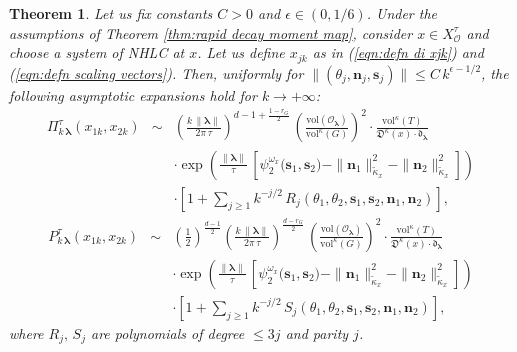 \documentclass[12pt,a4paper]{article}
\theoremstyle{plain}
\newtheorem{thm}{Theorem}[section]
\theoremstyle{definition}
\begin{document}
\begin{thm}
\label{thm:rescaled asympt}
Let us fix constants $C>0$ and $\epsilon\in (0,1/6)$.
Under the assumptions of Theorem 
\ref{thm:rapid decay moment map}, consider $x\in X^\tau_{\mathcal{O}}$ and choose a system
of NHLC at $x$. Let us define 
$x_{jk}$ as in (\ref{eqn:defn di xjk})
and (\ref{eqn:defn scaling vectors}).
Then, uniformly for 
$\|(\theta_j,\mathbf{n}_j,\mathbf{s}_j)\|
\le C\,k^{\epsilon-1/2}$, the following asymptotic expansions
hold for $k\rightarrow +\infty$:
\begin{eqnarray*}
\Pi^\tau_{k\,\boldsymbol{\lambda}}(x_{1k},x_{2k})
&\sim&
\left( \frac{k\,\| \boldsymbol{\lambda} \|}{2\pi\,\tau}  \right)
^{d-1+\frac{1-r_G}{2}}\,
\left(\frac{\mathrm{vol}(\mathcal{O}_{\boldsymbol{\lambda}})}{\mathrm{vol}^\kappa (G)}\right)^2\cdot 
\frac{\mathrm{vol}^\kappa
(T)}{\mathfrak{D}^\kappa (x)\cdot\mathfrak{d}_{\boldsymbol{\lambda}}}\nonumber
%
\\
&&\cdot 
\exp\left(\frac{\|\boldsymbol{\lambda}\|}{\tau}\,\left[
\psi_2^{\omega_x}\big( \mathbf{s}_1
%
,
\mathbf{s}_2  \big)
-\|
\mathbf{n}_1\|_{\tilde{\kappa}_x}^2
-\|\mathbf{n}_2\|_{\tilde{\kappa}_x}  ^2
\right]\right)\nonumber\\
&&\cdot \left[1+\sum_{j\ge 1}k^{-j/2}\,R_j(\theta_1,\theta_2,\mathbf{s}_1,
\mathbf{s}_2,\mathbf{n}_1,
\mathbf{n}_2)    \right],\nonumber
\end{eqnarray*}
%
%
\begin{eqnarray*}
P^\tau_{k\,\boldsymbol{\lambda}}(x_{1k},x_{2k})
&\sim&
\left(  \frac{1}{2} \right)^{\frac{d-1}{2}}
\left( \frac{k\,\| \boldsymbol{\lambda} \|}{2\pi\,\tau}  \right)
^{\frac{d-r_G}{2}}\,
\left(\frac{\mathrm{vol}(\mathcal{O}_{\boldsymbol{\lambda}})}{\mathrm{vol}^\kappa (G)}\right)^2\cdot 
\frac{\mathrm{vol}^\kappa
(T)}{\mathfrak{D}^\kappa (x)\cdot\mathfrak{d}_{\boldsymbol{\lambda}}}\nonumber
%
\\
&&\cdot 
\exp\left(\frac{\|\boldsymbol{\lambda}\|}{\tau}\,\left[
\psi_2^{\omega_x}\big( \mathbf{s}_1
%
,
\mathbf{s}_2  \big)
-\|
\mathbf{n}_1\|_{\tilde{\kappa}_x}^2
-\|\mathbf{n}_2\|_{\tilde{\kappa}_x}  ^2
\right]\right)\nonumber\\
&&\cdot \left[1+\sum_{j\ge 1}k^{-j/2}\,S_j(\theta_1,\theta_2,\mathbf{s}_1,
\mathbf{s}_2,\mathbf{n}_1,
\mathbf{n}_2)    \right],\nonumber\nonumber
\end{eqnarray*}
where $R_j,\,S_j$ are polynomials of degree $\le 3j$ and
parity $j$.

\end{thm}
\end{document}
